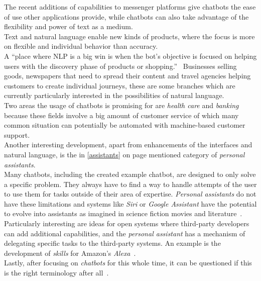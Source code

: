 The recent additions of capabilities to messenger platforms give chatbots the ease of use other applications provide,
while chatbots can also take advantage of the flexibility and power of text as a medium.
\\

Text and natural language enable new kinds of products, where the focus is more on flexible and individual behavior than accuracy.
\\
A ``place where NLP is a big win is when the bot’s objective is focused on helping users with the discovery phase of products or shopping.''~\cite{neednlp}
Businesses selling goods, newspapers that need to spread their content and travel agencies helping customers to create individual journeys,
these are some branches which are currently particularly interested in the possibilities of natural language.
\\
Two areas the usage of chatbots is promising for are \emph{health care} and \emph{banking}~\cite{botlist}
because these fields involve a big amount of customer service of which many common situation can potentially be automated with machine-based customer support.
\\

Another interesting development, apart from enhancements of the interfaces and natural language, is the in \ref{assistants} on page \pageref{assistants} mentioned category of \emph{personal assistants}.
\\

Many chatbots, including the created example chatbot, are designed to only solve a specific problem.
They always have to find a way to handle attempts of the user to use them for tasks outside of their area of expertise.
\emph{Personal assistants} do not have these limitations
and systems like \emph{Siri} or \emph{Google Assistant} have the potential to evolve into assistants as imagined in science fiction movies and literature~\cite{assistant}.
\\

Particularly interesting are ideas for open systems where third-party developers can add additional capabilities,
and the \emph{personal assistant} has a mechanism of delegating specific tasks to the third-party systems.
An example is the development of \emph{skills} for Amazon's \emph{Alexa}~\cite{alexa}.
\\

Lastly, after focusing on \emph{chatbots} for this whole time,
it can be questioned if this is the right terminology after all~\cite{botnerds}.


